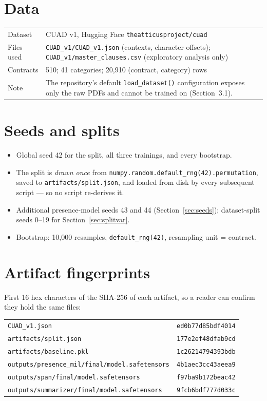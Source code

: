 \section*{Data}
\begin{tabular}{p{4.5cm} p{9cm}}
\toprule
Dataset & CUAD v1, Hugging Face \texttt{theatticusproject/cuad}\\
Files used & \texttt{CUAD\_v1/CUAD\_v1.json} (contexts, character offsets); \texttt{CUAD\_v1/master\_clauses.csv} (exploratory analysis only)\\
Contracts & 510; 41 categories; 20{,}910 (contract, category) rows\\
Note & The repository's default \texttt{load\_dataset()} configuration exposes only the raw PDFs and cannot be trained on (Section~3.1).\\
\bottomrule
\end{tabular}

\section*{Seeds and splits}
\begin{itemize}[itemsep=2pt]
  \item Global seed 42 for the split, all three trainings, and every bootstrap.
  \item The split is \emph{drawn once} from \texttt{numpy.random.default\_rng(42).permutation}, saved to \texttt{artifacts/split.json}, and loaded from disk by every subsequent script --- so no script re-derives it.
  \item Additional presence-model seeds 43 and 44 (Section~\ref{sec:seeds}); dataset-split seeds 0--19 for Section~\ref{sec:splitvar}.
  \item Bootstrap: 10{,}000 resamples, \texttt{default\_rng(42)}, resampling unit = contract.
\end{itemize}

\section*{Artifact fingerprints}
First 16 hex characters of the SHA-256 of each artifact, so a reader can confirm they hold the same files:

\begin{tabular}{p{7cm} p{6cm}}
\toprule
\texttt{CUAD\_v1.json} & \texttt{ed0b77d85bdf4014}\\
\texttt{artifacts/split.json} & \texttt{177e2ef48dfab9cd}\\
\texttt{artifacts/baseline.pkl} & \texttt{1c26214794393bdb}\\
\texttt{outputs/presence\_mil/final/model.safetensors} & \texttt{4b1aec3cc43aeea9}\\
\texttt{outputs/span/final/model.safetensors} & \texttt{f97ba9b172beac42}\\
\texttt{outputs/summarizer/final/model.safetensors} & \texttt{9fcb6bdf777d033c}\\
\bottomrule
\end{tabular}

